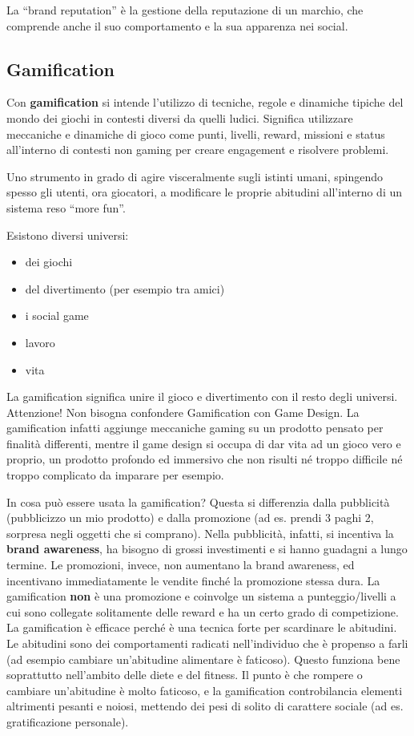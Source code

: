 La ``brand reputation'' è la gestione della reputazione di un marchio, che
comprende anche il suo comportamento e la sua apparenza nei social.

\subsection{Gamification}

Con \textbf{gamification} si intende l'utilizzo di tecniche, regole e dinamiche
tipiche del mondo dei giochi in contesti diversi da quelli ludici.
Significa utilizzare meccaniche e dinamiche di gioco come punti, livelli,
reward, missioni e status all'interno di contesti non gaming per creare
engagement e risolvere problemi.

Uno strumento in grado di agire visceralmente sugli istinti umani, spingendo
spesso gli utenti, ora giocatori, a modificare le proprie abitudini all’interno
di un sistema reso ``more fun''.

Esistono diversi universi:
\begin{itemize}
 \item dei giochi
 \item del divertimento (per esempio tra amici)
 \item i social game
 \item lavoro
 \item vita
\end{itemize}

La gamification significa unire il gioco e divertimento con il resto degli
universi. Attenzione! Non bisogna confondere Gamification con Game Design. La
gamification infatti aggiunge meccaniche gaming su un prodotto pensato per
finalità differenti, mentre il game design si occupa di dar vita ad un gioco
vero e proprio, un prodotto profondo ed immersivo che non risulti né troppo
difficile né troppo complicato da imparare per esempio.

In cosa può essere usata la gamification? Questa si differenzia dalla
pubblicità (pubblicizzo un mio prodotto) e dalla promozione (ad es. prendi 3
paghi 2, sorpresa negli oggetti che si comprano). Nella pubblicità, infatti, si
incentiva la \textbf{brand awareness}, ha bisogno di grossi investimenti e si
hanno guadagni a lungo termine.
Le promozioni, invece, non aumentano la brand awareness, ed incentivano
immediatamente le vendite finché la promozione stessa dura.
La gamification \textbf{non} è una promozione e coinvolge un sistema a
punteggio/livelli a cui sono collegate solitamente delle reward e ha un certo
grado di competizione.
La gamification è efficace perché è una tecnica forte per scardinare le
abitudini. Le abitudini sono dei comportamenti radicati nell'individuo che è
propenso a farli (ad esempio cambiare un'abitudine alimentare è faticoso).
Questo funziona bene soprattutto nell'ambito delle diete e del fitness.
Il punto è che rompere o cambiare un'abitudine è molto faticoso, e la
gamification controbilancia elementi altrimenti pesanti e noiosi, mettendo dei
pesi di solito di carattere sociale (ad es. gratificazione personale).

